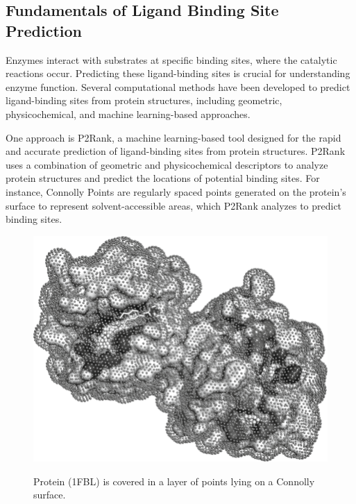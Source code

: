 \subsection{Fundamentals of Ligand Binding Site Prediction}
\label{sec:Fundamentals of Ligand Binding Site Prediction}

Enzymes interact with substrates at specific binding sites, where the catalytic reactions occur. Predicting these ligand-binding sites is crucial for understanding enzyme function. Several computational methods have been developed to predict ligand-binding sites from protein structures, including geometric, physicochemical, and machine learning-based approaches.

One approach is P2Rank, a machine learning-based tool designed for the rapid and accurate prediction of ligand-binding sites from protein structures. P2Rank uses a combination of geometric and physicochemical descriptors to analyze protein structures and predict the locations of potential binding sites. For instance, Connolly Points are regularly spaced points generated on the protein’s surface to represent solvent-accessible areas, which P2Rank analyzes to predict binding sites.

\begin{figure}[hbt]
    \centering
    \begin{minipage}[t]{.8\textwidth}
    \caption{Protein (1FBL) is covered in a layer of points lying on a Connolly surface.}
    \includegraphics[width=1\textwidth]{img/connolly-points.png}\\
    \label{fig:connolly-points-p2rank}
    \end{minipage}
\end{figure}

